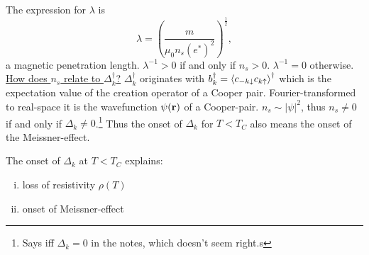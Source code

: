 The expression for $\lambda$ is
\begin{equation}
	\lambda = \left( \frac{m}{\mu_0n_s\left( e^* \right)^2} \right)^\frac{1}{2},
\end{equation}
a magnetic penetration length. $\lambda^{-1} > 0 $ if and only if $n_s >0$. $\lambda^{-1}=0$ otherwise. 
\underline{How does $n_s$ relate to $\Delta_k^\dagger$?}
$\Delta_k^\dagger$ originates with $b_k^\dagger = \ev{c_{-k\downarrow}c_{k\uparrow}}^\dagger$ which is the expectation value of the creation operator of a Cooper pair. Fourier-transformed to real-space it is the wavefunction $\psi(\vb r)$ of a Cooper-pair. $n_s \sim |\psi|^2$, thus $n_s \ne 0$ if and only if $\Delta_k\ne0$.\footnote{Says iff $\Delta_k = 0$ in the notes, which doesn't seem right.s}
Thus the onset of $\Delta_k$ for $T<T_C$ also means the onset of the Meissner-effect. 
\begin{tcolorbox}[center, width = 0.6\textwidth]
The onset of $\Delta_k$ at $T<T_C$ explains:
\begin{enumerate}[i)]
	\item loss of resistivity $\rho(T)$
	\item onset of Meissner-effect
\end{enumerate}
\end{tcolorbox}  